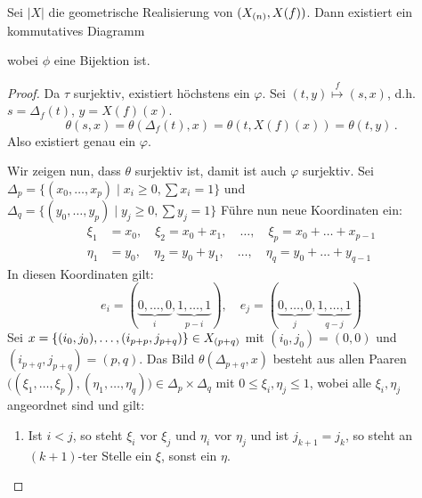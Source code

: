 \begin{lemma}
  Sei $|X|$ die geometrische Realisierung von $(X_{(n)}, X(f))$. Dann
  existiert ein kommutatives Diagramm
  \begin{center}
  \end{center}
  wobei $\phi$ eine Bijektion ist.
\end{lemma}
\begin{proof}
  Da $\tau$ surjektiv, existiert höchstens ein $\varphi$. Sei 
  $(t,y) \overset f \longmapsto (s,x)$, d.h. $s = \Delta_f(t)$, 
  $y = X(f)(x)$.
  \[ \theta(s,x) = \theta(\Delta_f(t),x) = \theta(t, X(f)(x))
    = \theta(t,y)\,.\]
  Also existiert genau ein $\varphi$.

  Wir zeigen nun, dass $\theta$ surjektiv ist, damit ist auch $\varphi$
  surjektiv.
  Sei $\Delta_p = \{ (x_0,\ldots, x_p) \mid x_i\geq 0, \sum x_i = 1\}$
  und $\Delta_q = \{ (y_0,\ldots,y_p) \mid y_j\geq 0, \sum y_j = 1\}$
  Führe nun neue Koordinaten ein:
  \begin{align*}
    \xi_1 &= x_0,\quad \xi_2 = x_0+x_1,\quad\ldots,\quad 
      \xi_p = x_0 + \ldots + x_{p-1}\\
    \eta_1 &= y_0, \quad \eta_2 = y_0+y_1, \quad\ldots,\quad 
      \eta_q = y_0 + \ldots + y_{q-1}
  \end{align*}
  In diesen Koordinaten gilt:
  \[ e_i = (\underbrace{0,\ldots,0}_i, \underbrace{1,\ldots,1}_{p-i}),\quad
  e_j = (\underbrace{0,\ldots,0}_j, \underbrace{1,\ldots,1}_{q-j}) \]
  Sei $x = \{(i_0,j_0) ,\ldots, (i_{p+p},j_{p+q})\} \in X_{(p+q)}$ mit
  $(i_0,j_0) = (0,0)$ und $(i_{p+q},j_{p+q}) = (p,q)$.
  Das Bild $\theta(\Delta_{p+q}, x)$ besteht aus allen Paaren
  $\big( (\xi_1,\ldots,\xi_p),(\eta_1,\ldots,\eta_q) \big) \in 
  \Delta_p\times\Delta_q$ mit $0\leq \xi_i,\eta_j\leq 1$, wobei alle
  $\xi_i,\eta_j$ angeordnet sind und gilt:
  \begin{enumerate}[label=(\roman*)]
    \item Ist $i<j$, so steht $\xi_i$ vor $\xi_j$ und $\eta_i$ vor $\eta_j$
      und ist $j_{k+1} = j_k$, so steht an $(k+1)$-ter Stelle
      ein $\xi$, sonst ein $\eta$.
  \end{enumerate}
\end{proof}

